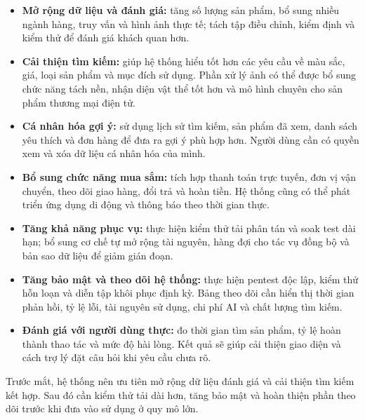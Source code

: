\begin{itemize}[nosep]
    \item \textbf{Mở rộng dữ liệu và đánh giá:} tăng số lượng sản phẩm, bổ sung nhiều ngành hàng, truy vấn và hình ảnh thực tế; tách tập điều chỉnh, kiểm định và kiểm thử để đánh giá khách quan hơn.

    \item \textbf{Cải thiện tìm kiếm:} giúp hệ thống hiểu tốt hơn các yêu cầu về màu sắc, giá, loại sản phẩm và mục đích sử dụng. Phần xử lý ảnh có thể được bổ sung chức năng tách nền, nhận diện vật thể tốt hơn và mô hình chuyên cho sản phẩm thương mại điện tử.

    \item \textbf{Cá nhân hóa gợi ý:} sử dụng lịch sử tìm kiếm, sản phẩm đã xem, danh sách yêu thích và đơn hàng để đưa ra gợi ý phù hợp hơn. Người dùng cần có quyền xem và xóa dữ liệu cá nhân hóa của mình.

    \item \textbf{Bổ sung chức năng mua sắm:} tích hợp thanh toán trực tuyến, đơn vị vận chuyển, theo dõi giao hàng, đổi trả và hoàn tiền. Hệ thống cũng có thể phát triển ứng dụng di động và thông báo theo thời gian thực.

    \item \textbf{Tăng khả năng phục vụ:} thực hiện kiểm thử tải phân tán và soak test dài hạn; bổ sung cơ chế tự mở rộng tài nguyên, hàng đợi cho tác vụ đồng bộ và bản sao dữ liệu để giảm gián đoạn.

    \item \textbf{Tăng bảo mật và theo dõi hệ thống:} thực hiện pentest độc lập, kiểm thử hỗn loạn và diễn tập khôi phục định kỳ. Bảng theo dõi cần hiển thị thời gian phản hồi, tỷ lệ lỗi, tài nguyên sử dụng, chi phí AI và chất lượng tìm kiếm.

    \item \textbf{Đánh giá với người dùng thực:} đo thời gian tìm sản phẩm, tỷ lệ hoàn thành thao tác và mức độ hài lòng. Kết quả sẽ giúp cải thiện giao diện và cách trợ lý đặt câu hỏi khi yêu cầu chưa rõ.
\end{itemize}

Trước mắt, hệ thống nên ưu tiên mở rộng dữ liệu đánh giá và cải thiện tìm kiếm kết hợp. Sau đó cần kiểm thử tải dài hơn, tăng bảo mật và hoàn thiện phần theo dõi trước khi đưa vào sử dụng ở quy mô lớn.
